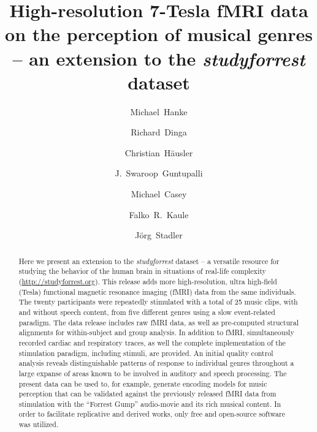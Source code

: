 



\title{High-resolution 7-Tesla fMRI data on the perception of musical genres -- an extension to the \textit{studyforrest} dataset}

\author[1,2]{Michael~Hanke}
\author[1]{Richard~Dinga}
\author[1]{Christian~Häusler}
\author[3]{J.~Swaroop~Guntupalli}
\author[1,4]{Michael~Casey}
\author[1,5]{Falko~R.~Kaule}
\author[6]{J\"org~Stadler}

\maketitle
\thispagestyle{fancy}

\begin{abstract}

Here we present an extension to the \textit{studyforrest} dataset -- a
versatile resource for studying the behavior of the human brain in situations
of real-life complexity (\url{http://studyforrest.org}). This release adds more
high-resolution, ultra high-field (\unit[7]{Tesla}) functional magnetic resonance
imaging (fMRI) data from the same individuals. The twenty participants were
repeatedly stimulated with a total of 25 music clips, with and without speech
content, from five different genres using a slow event-related paradigm. The
data release includes raw fMRI data, as well as pre-computed structural
alignments for within-subject and group analysis.  In addition to fMRI,
simultaneously recorded cardiac and respiratory traces, as well the complete
implementation of the stimulation paradigm, including stimuli, are provided. An
initial quality control analysis reveals distinguishable patterns of response
to individual genres throughout a large expanse of areas known to be involved
in auditory and speech processing.  The present data can be used to, for
example, generate encoding models for music perception that can be validated
against the previously released fMRI data from stimulation with the ``Forrest
Gump'' audio-movie and its rich musical content.  In order to facilitate
replicative and derived works, only free and open-source software was utilized.

\end{abstract}
\clearpage

